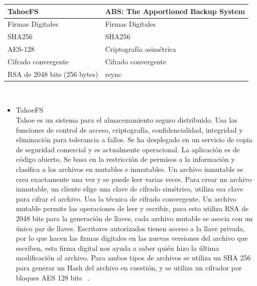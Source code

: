 \begin{tabular}{ |p{8cm}|p{8cm}| }
\hline
{ \textbf{TahoeFS}} & {\textbf{ABS: The Apportioned Backup System} } \\
\hline
{Firmas Digitales} & {Firmas Digitales} \\
\hline
{SHA256} & {SHA256} \\
\hline
{AES-128} & {Criptografía asimétrica} \\
\hline
{Cifrado convergente} & {Cifrado convergente} \\
\hline
{RSA de 2048 bits (256 bytes) } & { rsync } \\
\hline
\end{tabular}
\\
\begin{itemize}
\item TahoeFS\\

Tahoe es un sistema para el almacenamiento seguro distribuido. Usa las funciones de control de acceso, criptografía, confidencialidad, integridad y eliminación para tolerancia a fallos. Se ha desplegado en un servicio de copia de seguridad comercial y es actualmente operacional. La aplicación es de código abierto. Se basa en la restricción de permisos a la información y clasifica a los archivos en mutables e inmutables. Un archivo inmutable se crea exactamente una vez y se puede leer varias veces. Para crear un archivo inmutable, un cliente elige una clave de cifrado simétrico, utiliza esa clave para cifrar el archivo. Usa la técnica de cifrado convergente.
Un archivo mutable permite las operaciones de leer y escribir, para esto utiliza RSA de 2048 bits para la generación de llaves, cada archivo mutable se asocia con un único par de llaves. Escritores autorizados tienen acceso a la llave privada, por lo que hacen las firmas digitales en las nuevas versiones del archivo que escriben, esta firma digital nos ayuda a saber quién hizo la última modificación al archivo.
Para ambos tipos de archivos se utiliza un SHA 256 para generar un Hash del archivo en cuestión, y se utiliza un cifrador por bloques AES 128 bits ~\cite{tahoe}. \\



\end{itemize}
